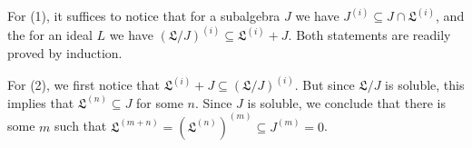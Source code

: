 For (1), it suffices to notice that for a subalgebra $J$ we have
$J^{(i)} \subseteq J\cap \mathfrak{L}^{(i)}$, and the for an ideal $L$ we have
$(\mathfrak{L}/J)^{(i)} \subseteq \mathfrak{L}^{(i)} + J$. Both statements are readily proved
by induction.

For (2), we first notice that $\mathfrak{L}^{(i)} + J \subseteq (\mathfrak{L}/J)^{(i)}$.
But since $\mathfrak{L}/J$ is soluble, this implies that $\mathfrak{L}^{(n)} \subseteq J$
for some $n$. Since $J$ is soluble, we conclude that there is some $m$ such that
$\mathfrak{L}^{(m + n)} = (\mathfrak{L}^{(n)})^{(m)} \subseteq J^{(m)} = 0$.
